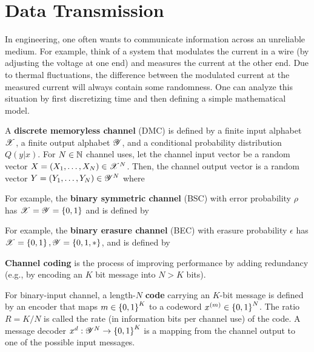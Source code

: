 \documentclass[letterpaper,10pt,english]{article}
\begin{document}
\section{Data Transmission}

In engineering, one often wants to communicate information across an unreliable medium. 
For example, think of a system that modulates the current in a wire (by adjusting the voltage at one end) and measures the current at the other end. 
Due to thermal fluctuations, the difference between the modulated current at the measured current will always contain some randomness. 
One can analyze this situation by first discretizing time and then defining a simple mathematical model. 

\begin{defn}
A \textbf{discrete memoryless channel} (DMC) is defined by a finite input alphabet $\mathscr{X}$, 
a finite output alphabet $\mathscr{Y}$, and a conditional probability distribution $Q(y|x)$. 
For $N \in \mathbb{N}$ channel uses, let the channel input vector be a random vector $X = (X_1, \dots, X_N) \in \mathscr{X}^N$. 
Then, the channel output vector is a random vector $Y = (Y_1, \dots,Y_N) \in \mathscr{Y}^N$ where 
\end{defn} 
\begin{shaded*}\begin{exmp}
For example, the \textbf{binary symmetric channel} (BSC) with error probability $\rho$ has $\mathscr{X} = \mathscr{Y} = \left\{0, 1\right\}$ and is defined by
\end{exmp}\end{shaded*} 
\begin{shaded*}\begin{exmp}
 For example, the \textbf{binary erasure channel} (BEC) with erasure probability $\epsilon$ has $\mathscr{X} = \left\{0,1\right\}, \mathscr{Y} =  \left\{0,1,\ast\right\}$, and is defined by 

\textbf{Channel coding} is the process of improving performance by adding redundancy (e.g., by encoding an $K$ bit message into $N > K$ bits).
\end{exmp}\end{shaded*} 
\begin{defn} 
For binary-input channel, a length-$N$ \textbf{code} carrying an $K$-bit message is defined by an encoder that maps $m \in \left\{0,1\right\}^K$ to a codeword $x^{(m)} \in \left\{0,1\right\}^N$. 
The ratio $R = K/N$ is called the rate (in information bits per channel use) of the code. 
A message decoder $x^d : \mathscr{Y}^N \to \left\{0,1\right\}^K$ is a mapping from the channel output to one of the possible input messages.
\end{defn} 
\end{document}
